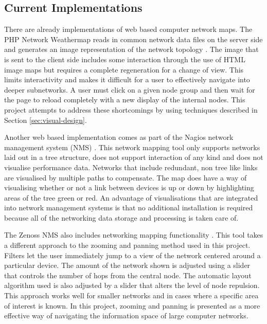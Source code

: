 \documentclass[11pt, a4paper]{article}
\begin{document}
\subsection{Current Implementations}
\label{sec:current-implementations}

There are already implementations of web based computer network maps. The PHP
Network Weathermap reads in common network data files on the server side and
generates an image representation of the network topology
\cite{PHP_Network_Weathermap_website}. The image that is sent to the client side
includes some interaction through the use of HTML image maps but requires a
complete regeneration for a change of view. This limits interactivity and makes
it difficult for a user to effectively navigate into deeper subnetworks. A user
must click on a given node group and then wait for the page to reload completely
with a new display of the internal nodes. This project attempts to address
these shortcomings by using techniques described in Section
\ref{sec:visual-design}. 

Another web based implementation comes as part of the Nagios network management
system (NMS) \cite{Nagios_website}. This network mapping tool only supports
networks laid out in a tree structure, does not support interaction of any kind
and does not visualise performance data. Networks that include redundant, non
tree like links are visualised by multiple paths to compensate. The map does
have a way of visualising whether or not a link between devices is up or down by
highlighting areas of the tree green or red. An advantage of visualisations that
are integrated into network management systems is that no additional
installation is required because all of the networking data storage and
processing is taken care of.

The Zenoss NMS also includes networking mapping functionality
\cite{Zenoss_website}. This tool takes a different approach to the zooming and
panning method used in this project. Filters let the user immediately jump to a
view of the network centered around a particular device. The amount of the
network shown is adjusted using a slider that controls the number of hops from
the central node. The automatic layout algorithm used is also adjusted by a
slider that alters the level of node repulsion. This approach works well for
smaller networks and in cases where a specific area of interest is known. In
this project, zooming and panning is presented as a more effective way of
navigating the information space of large computer networks.
\end{document}
